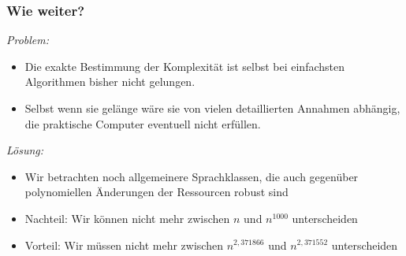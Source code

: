 \documentclass[aspectratio=1610,onlymath]{beamer}
\begin{document}
\begin{frame}\frametitle{Wie weiter?}


\emph{Problem:}
\begin{itemize}
\item Die exakte Bestimmung der Komplexität ist selbst bei einfachsten Algorithmen bisher nicht gelungen.
\item Selbst wenn sie gelänge wäre sie von vielen detaillierten Annahmen abhängig, die praktische Computer eventuell nicht erfüllen.
\end{itemize}
\bigskip\pause

\emph{Lösung:}
\begin{itemize}
\item Wir betrachten \alert{noch allgemeinere Sprachklassen}, die auch gegenüber polynomiellen Änderungen der Ressourcen robust sind
\item Nachteil: Wir können nicht mehr zwischen $n$ und $n^{1000}$ unterscheiden
\item Vorteil: Wir müssen nicht mehr zwischen $n^{2,371866}$ und $n^{2,371552}$ unterscheiden
\end{itemize}

\end{frame}
\end{document}
